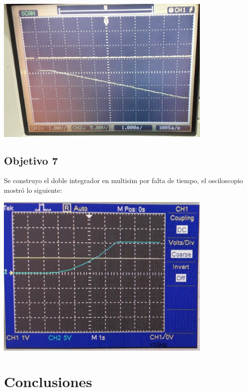 \documentclass[DIV=calc, paper=a4, fontsize=11pt]{scrartcl}
\newenvironment{Figura}
  {\par\medskip\noindent\minipage{\linewidth}}
  {\endminipage\par\medskip}
\begin{document}
\begin{multicols}{2}
\begin{Figura}
    \centering
    \includegraphics[width=0.8\textwidth]{OsciloscipioIntegrador.jpeg}
    \label{fig}
\end{Figura}

\subsection*{Objetivo 7}

Se construyo el doble integrador en multisim por falta de tiempo, el osciloscopio mostró lo siguiente:

\begin{Figura}
    \centering
    \includegraphics[width=0.8\textwidth]{OsciloscipioDobleIntegrador.jpeg}
    \label{fig}
\end{Figura}

\section*{Conclusiones}

\end{multicols}
\end{document}
